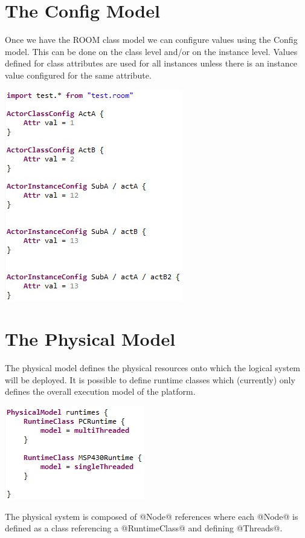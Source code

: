 \section{The Config Model}

Once we have the ROOM class model we can configure values using the Config model. This can be done on the class level and/or on the instance level. Values defined for class attributes are used for all instances unless there is an instance value configured for the same attribute.

\includegraphics{images/080-config.jpg}

\section{The Physical Model}

The physical model defines the physical resources onto which the logical system will be deployed. It is possible to define runtime classes which (currently) only defines the overall execution model of the platform.

\includegraphics{images/080-runtimes.jpg}

The physical system is composed of @Node@ references where each @Node@ is defined as a class referencing a @RuntimeClass@ and defining @Threads@.

